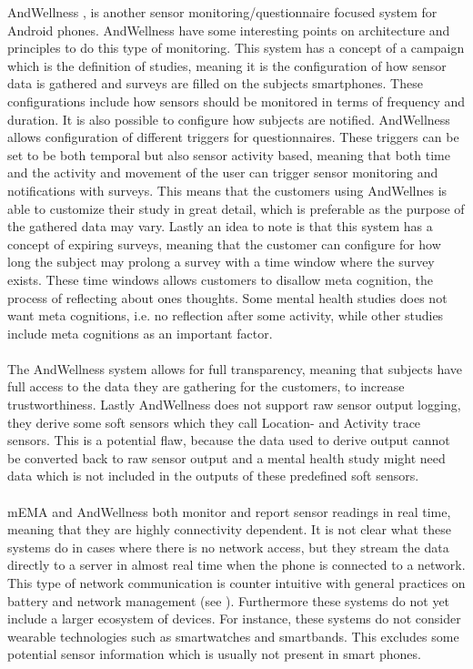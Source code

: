 AndWellness \parencite{hicks2010andwellness}, is another sensor monitoring/questionnaire focused system for Android phones. AndWellness have some interesting points on architecture and principles to do this type of monitoring. This system has a concept of a campaign which is the definition of studies, meaning it is the configuration of how sensor data is gathered and surveys are filled on the subjects smartphones. These configurations include how sensors should be monitored in terms of frequency and duration. It is also possible to configure how subjects are notified. AndWellness allows configuration of different triggers for questionnaires. These triggers can be set to be both temporal but also sensor activity based, meaning that both time and the activity and movement of the user can trigger sensor monitoring and notifications with surveys. This means that the customers using AndWellnes is able to customize their study in great detail, which is preferable as the purpose of the gathered data may vary. Lastly an idea to note is that this system has a concept of expiring surveys, meaning that the customer can configure for how long the subject may prolong a survey with a time window where the survey exists. These time windows allows customers to disallow meta cognition, the process of reflecting about ones thoughts. Some mental health studies does not want meta cognitions, i.e. no reflection after some activity, while other studies include meta cognitions as an important factor. 
\\\\
The AndWellness system allows for full transparency, meaning that subjects have full access to the data they are gathering for the customers, to increase trustworthiness. Lastly AndWellness does not support raw sensor output logging, they derive some soft sensors which they call Location- and Activity trace sensors. This is a potential flaw, because the data used to derive output cannot be converted back to raw sensor output and a mental health study might need data which is not included in the outputs of these predefined soft sensors.
\\\\
mEMA and AndWellness both monitor and report sensor readings in real time, meaning that they are highly connectivity dependent. It is not clear what these systems do in cases where there is no network access, but they stream the data directly to a server in almost real time when the phone is connected to a network. This type of network communication is counter intuitive with general practices on battery and network management (see ). Furthermore these systems do not yet include a larger ecosystem of devices. For instance, these systems do not consider wearable technologies such as smartwatches and smartbands. This excludes some potential sensor information which is usually not present in smart phones.

